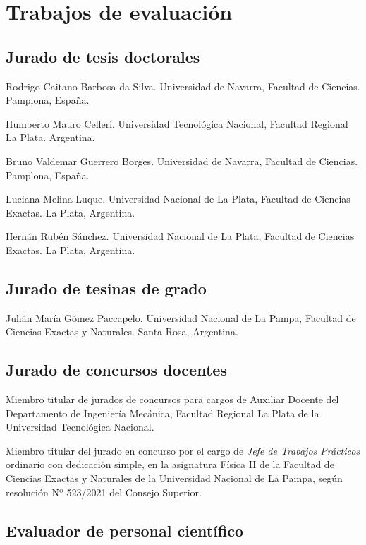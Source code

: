 \section{Trabajos de evaluación}

\subsection{Jurado de tesis doctorales}
 Rodrigo Caitano Barbosa da Silva. Universidad de Navarra, Facultad de Ciencias. Pamplona, España.

 Humberto Mauro Celleri. Universidad Tecnológica Nacional, Facultad Regional La Plata. Argentina.

 Bruno Valdemar Guerrero Borges. Universidad de Navarra, Facultad de Ciencias. Pamplona, España.

 Luciana Melina Luque. Universidad Nacional de La Plata, Facultad de Ciencias Exactas. La Plata, Argentina.

 Hernán Rubén Sánchez. Universidad Nacional de La Plata, Facultad de Ciencias Exactas. La Plata, Argentina.

\subsection{Jurado de tesinas de grado}

 Julián María Gómez Paccapelo. Universidad Nacional de La Pampa, Facultad de Ciencias Exactas y Naturales. Santa Rosa, Argentina.

\subsection{Jurado de concursos docentes}

 Miembro titular de jurados de concursos para cargos de Auxiliar Docente del Departamento de Ingeniería Mecánica, Facultad Regional La Plata de la Universidad Tecnológica Nacional.

 Miembro titular del jurado en concurso por el cargo de \textit{Jefe de Trabajos Prácticos} ordinario con dedicación simple, en la asignatura Física II de la Facultad de Ciencias Exactas y Naturales de la Universidad Nacional de La Pampa, según resolución Nº 523/2021 del Consejo Superior.


\subsection{Evaluador de personal científico}

